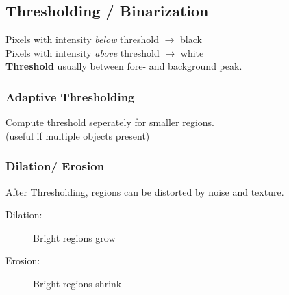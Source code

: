 \subsection{Thresholding / Binarization}
    Pixels with intensity \textit{below} threshold $\rightarrow$ black\\
    Pixels with intensity \textit{above} threshold $\rightarrow$ white\\
    \textbf{Threshold} usually between fore- and background peak.
    
    \subsubsection{Adaptive Thresholding}
        Compute threshold seperately for smaller regions.\\
        (useful if multiple objects present)  

    \subsubsection{Dilation/ Erosion}
        After Thresholding, regions can be distorted by noise and texture.
        \begin{description}
            \item[Dilation:] Bright regions grow
            \item[Erosion:] Bright regions shrink
        \end{description}
        \begin{center}
        \end{center}
    \vfill \null \columnbreak

